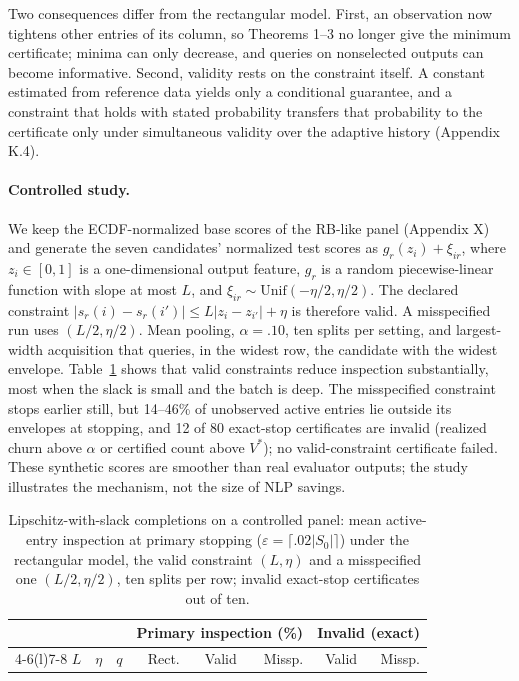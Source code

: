 \documentclass[11pt]{article}
\newcommand{\Sz}{S_0}
\begin{document}
Two consequences differ from the rectangular model. First, an observation now tightens other entries of its column, so Theorems 1--3 no longer give the minimum certificate; minima can only decrease, and queries on nonselected outputs can become informative. Second, validity rests on the constraint itself. A constant estimated from reference data yields only a conditional guarantee, and a constraint that holds with stated probability transfers that probability to the certificate only under simultaneous validity over the adaptive history (Appendix K.4).

\paragraph{Controlled study.} We keep the ECDF-normalized base scores of the RB-like panel (Appendix X) and generate the seven candidates' normalized test scores as $g_r(z_i)+\xi_{ir}$, where $z_i\in[0,1]$ is a one-dimensional output feature, $g_r$ is a random piecewise-linear function with slope at most $L$, and $\xi_{ir}\sim\mathrm{Unif}(-\eta/2,\eta/2)$. The declared constraint $|s_r(i)-s_r(i')|\le L|z_i-z_{i'}|+\eta$ is therefore valid. A misspecified run uses $(L/2,\eta/2)$. Mean pooling, $\alpha=.10$, ten splits per setting, and largest-width acquisition that queries, in the widest row, the candidate with the widest envelope. Table~\ref{tab:lipschitz} shows that valid constraints reduce inspection substantially, most when the slack is small and the batch is deep. The misspecified constraint stops earlier still, but 14--46\% of unobserved active entries lie outside its envelopes at stopping, and 12 of 80 exact-stop certificates are invalid (realized churn above $\alpha$ or certified count above $V^*$); no valid-constraint certificate failed. These synthetic scores are smoother than real evaluator outputs; the study illustrates the mechanism, not the size of NLP savings.

\begin{table}[t]
\centering\small
\setlength{\tabcolsep}{3pt}
\begin{tabular}{@{}rrr rrr rr@{}}
\toprule
& & & \multicolumn{3}{c}{Primary inspection (\%)} & \multicolumn{2}{c}{Invalid (exact)}\\
\cmidrule(lr){4-6}\cmidrule(l){7-8}
$L$ & $\eta$ & $q$ & Rect. & Valid & Missp. & Valid & Missp.\\
\midrule
\bottomrule
\end{tabular}
\caption{Lipschitz-with-slack completions on a controlled panel: mean active-entry inspection at primary stopping ($\varepsilon=\lceil.02|\Sz|\rceil$) under the rectangular model, the valid constraint $(L,\eta)$ and a misspecified one $(L/2,\eta/2)$, ten splits per row; invalid exact-stop certificates out of ten.}
\label{tab:lipschitz}
\end{table}
\end{document}
